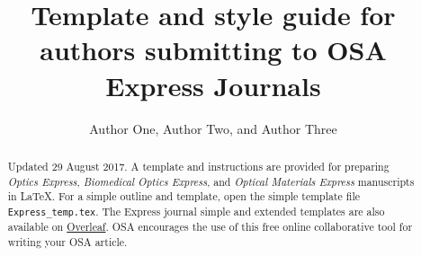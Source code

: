 \documentclass[10pt]{article}
\begin{document}
\title{Template and style guide for authors submitting to OSA Express Journals}

\author{Author One, Author Two, and Author Three}

\address{Peer Review, Publications Department, The Optical Society, 2010 Massachusetts Avenue NW, Washington, DC 20036, USA\\
Publications Department, The Optical Society, 2010 Massachusetts Avenue NW, Washington, DC 20036, USA\\
Currently with the Department of Electronic Journals, The Optical Society, 2010 Massachusetts Avenue NW, Washington, DC 20036, USA}




\begin{abstract}
Updated 29 August 2017. A template and instructions are provided for preparing \textit{Optics Express}, \textit{Biomedical Optics Express}, and \textit{Optical Materials Express} manuscripts in \LaTeX. For a simple outline and template, open the simple template file \texttt{Express\_temp.tex}. The Express journal simple and extended templates are also available on \href{http://www.overleaf.com/gallery/tagged/osa}{Overleaf}. OSA encourages the use of this free online collaborative tool for writing your OSA article.
\end{abstract}

\end{document}
